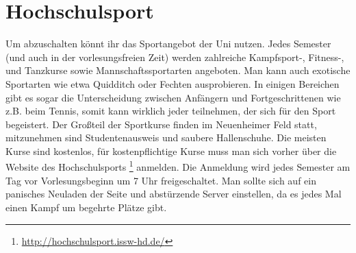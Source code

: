 \section{Hochschulsport}
Um abzuschalten könnt ihr das Sportangebot der Uni nutzen. Jedes Semester (und auch in der vorlesungsfreien Zeit) werden zahlreiche Kampfsport-, Fitness-, und Tanzkurse sowie Mannschaftssportarten angeboten. Man kann auch exotische Sportarten wie etwa Quidditch oder Fechten ausprobieren. In einigen Bereichen gibt es sogar die Unterscheidung zwischen Anfängern und Fortgeschrittenen wie z.B. beim Tennis, somit kann wirklich jeder teilnehmen, der sich für den Sport begeistert.
Der Großteil der Sportkurse finden im Neuenheimer Feld statt, mitzunehmen sind Studentenausweis und saubere Hallenschuhe.
Die meisten Kurse sind kostenlos, für kostenpflichtige Kurse muss man sich vorher über die Website des Hochschulsports \footnote{\url{http://hochschulsport.issw-hd.de/}} anmelden. Die Anmeldung wird jedes Semester am Tag vor Vorlesungsbeginn um 7 Uhr freigeschaltet. Man sollte sich auf ein panisches Neuladen der Seite und abstürzende Server einstellen, da es jedes Mal einen Kampf um begehrte Plätze gibt.
